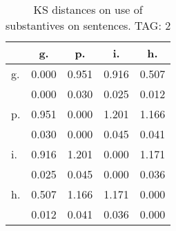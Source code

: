 \begin{table}[h!]
\begin{center}
\begin{tabular}{| l | c | c | c | c |}\hline
 & g. & p. & i. & h. \\\hline
g. & 0.000  & 0.951  & 0.916  & 0.507 \\\hline
 & 0.000  & 0.030  & 0.025  & 0.012 \\\hline
p. & 0.951  & 0.000  & 1.201  & 1.166 \\\hline
 & 0.030  & 0.000  & 0.045  & 0.041 \\\hline
i. & 0.916  & 1.201  & 0.000  & 1.171 \\\hline
 & 0.025  & 0.045  & 0.000  & 0.036 \\\hline
h. & 0.507  & 1.166  & 1.171  & 0.000 \\\hline
 & 0.012  & 0.041  & 0.036  & 0.000 \\\hline
\end{tabular}
\caption{KS distances on use of substantives on sentences. TAG: 2}
\end{center}
\end{table}